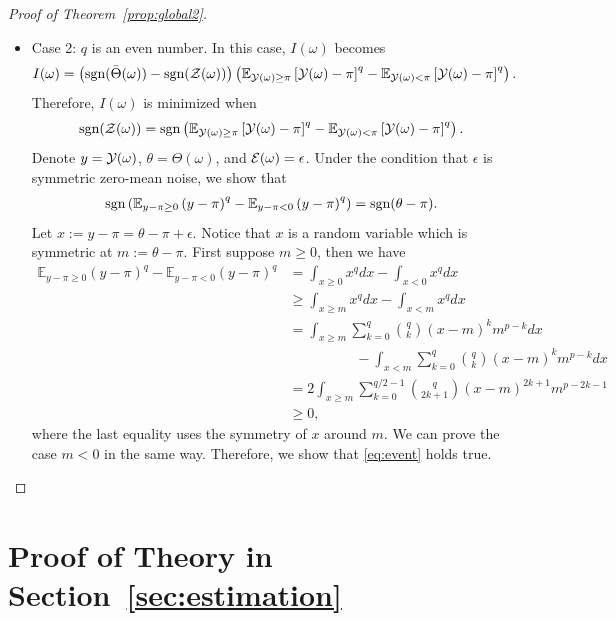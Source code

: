 \documentclass[twoside,11pt]{article}
\theoremstyle{definition}
\def\sign{\textup{sgn}}
\begin{document}
\begin{proof}[Proof of Theorem~\ref{prop:global2}]
\begin{itemize}[leftmargin=*,topsep=0pt,itemsep=-1ex,partopsep=1ex,parsep=1ex]
    \item Case 2: $q$ is an even number. In this case, $I(\omega)$ becomes
    \begin{align}
         I(\omega)  &=  
        \left(\sign(\bar\Theta(\omega))-\sign(\tZ(\omega))\right)\left(\mathbb{E}_{\tY(\omega)\geq \pi}\left[\tY(\omega)-\pi\right]^q-\mathbb{E}_{\tY(\omega)< \pi}\left[\tY(\omega)-\pi\right]^q\right).
    \end{align}
    Therefore, $I(\omega)$ is minimized when
    \begin{align}\label{eq:event}
        \sign(\tZ(\omega)) = \sign\left(\mathbb{E}_{\tY(\omega)\geq \pi}\left[\tY(\omega)-\pi\right]^q-\mathbb{E}_{\tY(\omega)< \pi}\left[\tY(\omega)-\pi\right]^q\right).
    \end{align}
    Denote $y=\mathcal{Y}(\omega)$, $\theta = \Theta(\omega)$, and $\mathcal{E}(\omega) = \epsilon$.
    Under the condition that $\epsilon$ is symmetric zero-mean noise, we show that
    \begin{align}\label{eq:even}
        \sign\left(\mathbb{E}_{y-\pi\geq 0}\left(y-\pi\right)^q-\mathbb{E}_{y-\pi<0}\left(y-\pi\right)^q\right) = \sign(\theta-\pi).
    \end{align}
    Let $x := y-\pi = \theta-\pi+\epsilon$. Notice that $x$ is a random variable which is symmetric at $m:= \theta-\pi$. First suppose $m\geq0$, then we have
    \begin{align}
      \mathbb{E}_{y-\pi\geq 0}\left(y-\pi\right)^q-\mathbb{E}_{y-\pi<0}\left(y-\pi\right)^q &=  \int_{x\geq 0}x^qdx-\int_{x<0}x^qdx\\&\geq \int_{x\geq m}x^qdx-\int_{x<m}x^qdx \\&=\int_{x\geq m}\sum_{k=0}^q{q\choose k}(x-m)^k m^{p-k}dx\\&\hspace{2cm}-\int_{x<m}\sum_{k=0}^q{q\choose k}(x-m)^{k}m^{p-k}dx\\&= 2\int_{x\geq m}\sum_{k=0}^{q/2-1}{q\choose 2k+1}(x-m)^{2k+1}m^{p-2k-1}\\&\geq 0,
    \end{align}
    where the last equality uses the symmetry of $x$ around $m$. We can prove the case $m<0$ in the same way.
    Therefore, we show that \eqref{eq:event} holds true.
 
\end{itemize}
\end{proof}




\section{Proof of Theory in Section~\ref{sec:estimation}}\label{sec:novalty}
\end{document}
